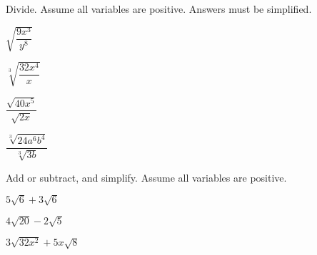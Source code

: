\begin{exercise}
	Divide. Assume all variables are positive. Answers must be simplified.\\
	\begin{enumerate*}[label={(\arabic*)~}]
		\item $\sqrt{\dfrac{9x^3}{y^8}}$
		\item $\sqrt[3]{\dfrac{32x^4}{x}}$
		\item $\dfrac{\sqrt{40x^5}}{\sqrt{2x}}$
		\item $\dfrac{\sqrt[3]{24a^6b^4}}{\sqrt[3]{3b}}$
		\hfill\null
	\end{enumerate*}
\end{exercise}



\vfill
\begin{center} \hfill
\end{center}

\newpage



\begin{exercise}
	Add or subtract, and simplify. Assume all variables are positive.\\
	\begin{enumerate*}[label={(\arabic*)~}]
		\item $5\sqrt6+3\sqrt6$
		\item $4\sqrt{20}-2\sqrt5$
		\item $3\sqrt{32x^2}+5x\sqrt{8}$
		\hfill\null
	\end{enumerate*}
\end{exercise}
\vfill
\begin{center} \hfill
\end{center}



